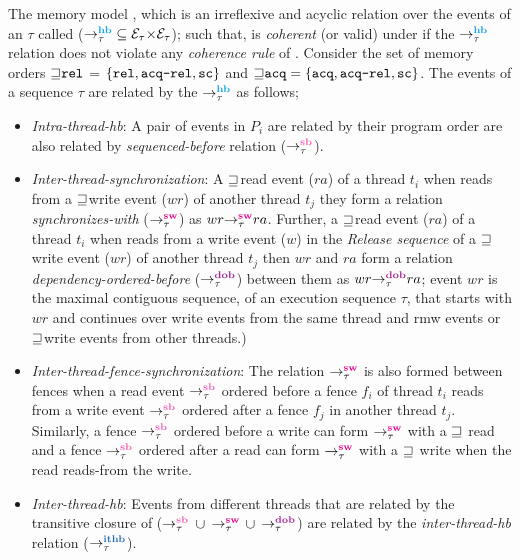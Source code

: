 The \cc memory model ,
which is an irreflexive and acyclic relation over the events of 
an  
$\tau$ called  
($\setHB \subseteq \events_\tau {\times} \events_\tau$);
such that,  is {\em coherent} (or valid) under \cc if 
the $\setHB$ relation does not violate any {\em coherence rule} of \cc
\cite{C11}\cite{batty2011mathematizing}.
%
Consider the set of memory orders ${\sqsupseteq} \texttt{rel}$ = $\{\texttt{rel}, \texttt{acq-rel}, \texttt{sc}\}$
and ${\sqsupseteq} \texttt{acq} = \{\texttt{acq}, \texttt{acq-rel}, \texttt{sc}\}$. 
%
The events of a sequence $\tau$ are related by the $\setHB$ as follows;
\begin{itemize}
	\item {\em Intra-thread-hb}: A pair of events in $P_i$ are related by
        their program order are also related by {\em sequenced-before} relation
	($\setSB$).
	
	\item {\em Inter-thread-synchronization}: A ${\sqsupseteq}$\acq read event ($ra$) of a thread 
	$t_i$ when reads from a ${\sqsupseteq}$\rel write event ($wr$) of another thread $t_j$ they form a
	relation {\em synchronizes-with} ($\setSW$) as $\sw{\tau}{wr}{ra}$.
	Further, a ${\sqsupseteq}$\acq read event ($ra$) of a thread $t_i$ when reads from a write 
	event ($w$) in the {\em Release sequence} \cite{C11} of a ${\sqsupseteq}$\rel write event ($wr$) of 
	another thread $t_j$ then $wr$ and $ra$ form a relation {\em dependency-ordered-before}
	($\setDOB$) between them as $\dob{\tau}{wr}{ra}$;
	event $wr$ is the maximal contiguous sequence, of an execution
	sequence $\tau$, that starts with $wr$ and continues over
	write events from the same thread and rmw events or
	${\sqsupseteq}$\rel write events from other threads.) 
	
	\item {\em Inter-thread-fence-synchronization}: The relation $\setSW$ is also formed 
	between \cc fences when a read event $\setSB$ ordered before a fence $f_i$ of thread 
	$t_i$ reads from a write event $\setSB$ ordered after a fence $f_j$ in another thread
	$t_j$.
	Similarly, a fence $\setSB$ ordered before a write can form $\setSW$ with a ${\sqsupseteq}$\acq
	read and a fence $\setSB$ ordered after a read can form $\setSW$ with a ${\sqsupseteq}$\rel
	write when the read reads-from the write. 
	
	\item {\em Inter-thread-hb}: Events from different threads that are related by the 
	transitive closure of ($\setSB$ $\cup$ $\setSW$ $\cup$ $\setDOB$) are related by 
	the {\em inter-thread-hb} relation ($\setITHB$). 
\end{itemize}

